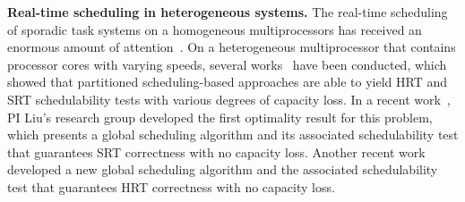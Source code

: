 \vspace{1mm} \noindent \textbf{Real-time scheduling in heterogeneous systems.} The real-time scheduling of sporadic task systems on a homogeneous multiprocessors has received an enormous amount of attention~\cite{andersson2003, baker2007, funk2005, Baruah2006a, chattopadhyay2011, baruah2005a, baruah2008, bertogna2011b, BC, baruah1996, goossens2003, baker2003, Cluster1, davis2011a, devi2005, baruah1996, baruah2007, G, Par}.  On a heterogeneous multiprocessor that contains processor cores with varying speeds, several works~\cite{raravi2014task, raravi2013assigning, niemeier2011partitioned} have been conducted, which showed that partitioned scheduling-based approaches are able to yield HRT and SRT schedulability tests with various degrees of capacity loss. In a recent work~\cite{Tong14a}, PI Liu's research group  developed the first optimality result for this problem, which presents a global scheduling algorithm and its associated schedulability test that guarantees SRT correctness with no capacity loss. Another recent work~\cite{Chwa15} developed a new global scheduling algorithm and the associated schedulability test that guarantees HRT correctness with no capacity loss. 

